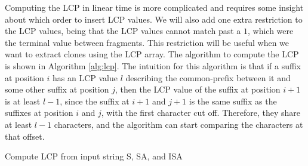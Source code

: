 Computing the LCP in linear time is more complicated and requires some insight about which
order to insert LCP values. We will also add one extra restriction to the LCP values,
being that the LCP values cannot match past a $1$, which were the terminal value between
fragments. This restriction will be useful when we want to extract clones using the LCP
array. The algorithm to compute the LCP is shown in Algorithm \ref{alg:lcp}. The intuition
for this algorithm is that if a suffix at position $i$ has an LCP value $l$ describing the
common-prefix between it and some other suffix at position $j$, then the LCP value of the
suffix at position $i + 1$ is at least $l - 1$, since the suffix at $i + 1$ and $j + 1$ is
the same suffix as the suffixes at position $i$ and $j$, with the first character cut off.
Therefore, they share at least $l - 1$ characters, and the algorithm can start comparing
the characters at that offset.

\begin{algorithm}[htp]
  \SetAlgoLined\DontPrintSemicolon

  \vspace{0.5cm}
  \caption{Compute LCP from input string S, SA, and ISA}
  \label{alg:lcp}
\end{algorithm}

